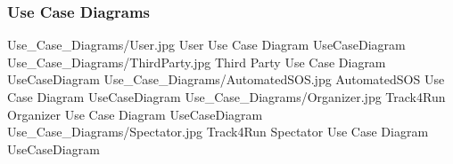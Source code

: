 \documentclass[../../../rasd.tex]{subfiles}
\begin{document}
\subsubsection{Use Case Diagrams}
\image {13cm} {Use_Case_Diagrams/User.jpg} {User Use Case Diagram} {UseCaseDiagram}
\image {13cm} {Use_Case_Diagrams/ThirdParty.jpg} {Third Party Use Case Diagram} {UseCaseDiagram}
\image {13cm} {Use_Case_Diagrams/AutomatedSOS.jpg} {AutomatedSOS Use Case Diagram} {UseCaseDiagram}
\image {13cm} {Use_Case_Diagrams/Organizer.jpg} {Track4Run Organizer Use Case Diagram} {UseCaseDiagram}
\image {13cm} {Use_Case_Diagrams/Spectator.jpg} {Track4Run Spectator Use Case Diagram} {UseCaseDiagram}
\end{document}
